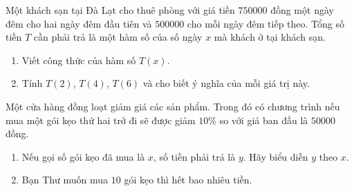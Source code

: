 \begin{vd}%
	Một khách sạn tại Đà Lạt cho thuê phòng với giá tiền $750000$ đồng một ngày đêm cho hai ngày đêm đầu tiên và $500000$ cho mỗi ngày đêm tiếp theo. Tổng số tiền $T$ cần phải trả là một hàm số của số ngày $x$ mà khách ở tại khách sạn.
	\begin{enumerate}
		\item Viết công thức của hàm số $T(x)$.
		\item Tính $T(2)$, $T(4)$, $T(6)$ và cho biết ý nghĩa của mỗi giá trị này.
	\end{enumerate}
\end{vd}
\baitaptl
\begin{bt}%
	Một cửa hàng đồng loạt giảm giá các sản phẩm. Trong đó có chương trình nếu mua một gói kẹo thứ hai trở đi sẽ được giảm $10\%$ so với giá ban đầu là $50000$ đồng.
	\begin{enumerate}
		\item Nếu gọi số gói kẹo đã mua là $x$, số tiền phải trả là $y$. Hãy biểu diễn $y$ theo $x$.
		\item Bạn Thư muốn mua $10$ gói kẹo thì hết bao nhiêu tiền.
	\end{enumerate}

\end{bt}

